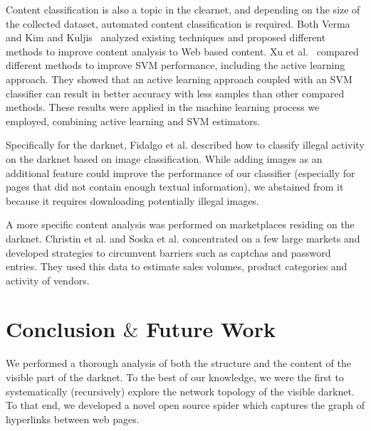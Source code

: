 Content classification is also a topic in the clearnet, and depending on the size of the collected dataset, automated content classification is required. 
Both Verma~\cite{Verma2013} and Kim and Kuljis~\cite{Kim2010} analyzed existing techniques and proposed different methods to improve content analysis to Web based content. Xu et al.~\cite{Xu2009} compared different methods to improve SVM performance, including the active learning approach. They showed that an active learning approach coupled with an SVM classifier can result in better accuracy with less samples than other compared methods. These results were applied in the machine learning process we employed, combining active learning and SVM estimators.

Specifically for the darknet, Fidalgo et al. \cite{Fidalgo2017} described how to classify illegal activity on the darknet based on image classification. While adding images as an additional feature could improve the performance of our classifier (especially for pages that did not contain enough textual information), we abstained from it because  it requires downloading potentially illegal images.


A more specific content analysis was performed on marketplaces residing on the darknet. Christin et al. \cite{Christin2013} and Soska et al. \cite{KyleSoska2015} concentrated on a few large markets and developed strategies to circumvent barriers such as captchas and password entries. They used this data to estimate sales volumes, product categories and activity of vendors.


\section{Conclusion $\&$ Future Work}

We performed a thorough analysis of both the structure and the content of the visible part of the darknet. To the best of our knowledge, we were the first to systematically (recursively) explore the network topology of the visible darknet. To that end, we developed a novel open source spider which captures the graph of hyperlinks between web pages. 

